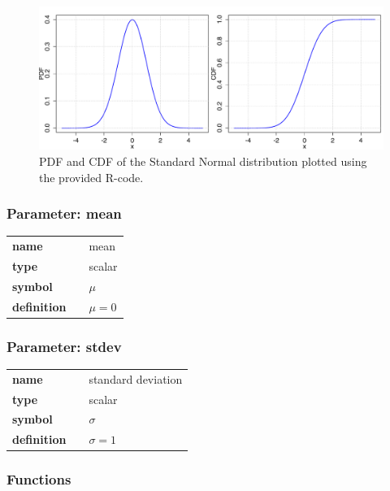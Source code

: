 \begin{figure}[htb!]
\centering
  \includegraphics[width=140mm]{pics/StandardNormal_pdf_cdf.pdf}
 \caption{PDF and CDF of the Standard Normal distribution plotted using the provided R-code.}
 \label{fig:StandardNormalpdfcdf}
\end{figure}

\subsubsection*{Parameter: mean}

\noindent\begin{tabular}{p{2cm}cl}
\textbf{name} & & mean \\
\textbf{type} & & scalar \\
\textbf{symbol} & & $\mu$  \\
\textbf{definition} & & $\mu=0$
\end{tabular}
\subsubsection*{Parameter: stdev}

\noindent\begin{tabular}{p{2cm}cl}
\textbf{name} & & standard deviation \\
\textbf{type} & & scalar \\
\textbf{symbol} & & $\sigma$  \\
\textbf{definition} & & $\sigma=1$
\end{tabular}
\subsubsection*{Functions}

